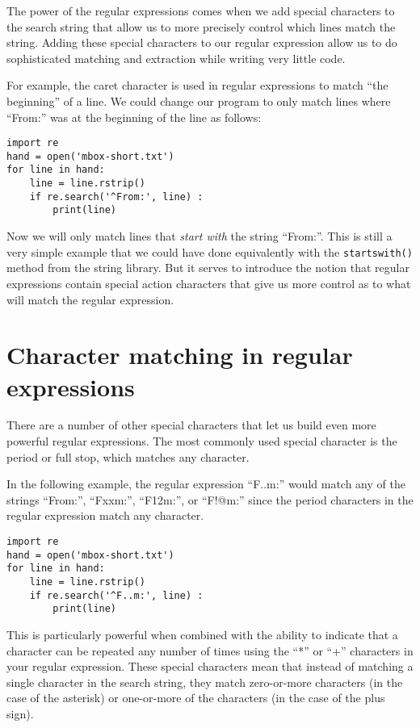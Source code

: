 The power of the regular expressions comes when we add special characters to the search string
that allow us to more precisely control which lines match the string.  Adding these special
characters to our regular expression allow us to do sophisticated matching and extraction while
writing very little code.

For example, the caret character is used in regular 
expressions to match ``the beginning'' of a line.
We could change our program to only match 
lines where ``From:'' was at the beginning of the line as follows:

\beforeverb
\begin{verbatim}
import re
hand = open('mbox-short.txt')
for line in hand:
    line = line.rstrip()
    if re.search('^From:', line) :
        print(line)
\end{verbatim}
\afterverb
%
Now we will only match lines that {\em start with} the string ``From:''.  This is still a very
simple example that we could have done equivalently with the {\tt startswith()} method from
the string library.  But it serves to introduce the notion that regular expressions contain
special action characters that give us more control as to what will match the regular expression.

\section{Character matching in regular expressions}

There are a number of other special characters that let us build even more powerful regular
expressions.  The most commonly used special character is the period or full stop, which matches
any character.

In the following example, the regular expression ``F..m:'' would match any of the strings
``From:'', ``Fxxm:'', ``F12m:'', or ``F!@m:'' since the period characters in the regular
expression match any character.

\beforeverb
\begin{verbatim}
import re
hand = open('mbox-short.txt')
for line in hand:
    line = line.rstrip()
    if re.search('^F..m:', line) :
        print(line)
\end{verbatim}
\afterverb
%
This is particularly powerful when combined with the ability to indicate that a character can
be repeated any number of times using the ``*'' or ``+'' characters in your regular expression.
These special characters mean that instead of matching a single character in the search string,
they match zero-or-more characters (in the case of the asterisk) or one-or-more of the characters
(in the case of the plus sign).

